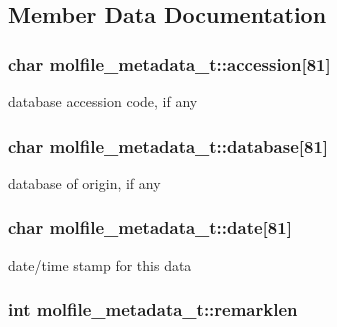 \subsection{\-Member \-Data \-Documentation}
\hypertarget{structmolfile__metadata__t_ae99a07985c93d299ed8383d3ef6fa9e7}{
\subsubsection[{accession}]{\setlength{\rightskip}{0pt plus 5cm}char {\bf molfile\-\_\-metadata\-\_\-t\-::accession}\mbox{[}81\mbox{]}}}\label{structmolfile__metadata__t_ae99a07985c93d299ed8383d3ef6fa9e7}
database accession code, if any \hypertarget{structmolfile__metadata__t_a385ecca8cfa3928877d74d31ad1cc05a}{
\subsubsection[{database}]{\setlength{\rightskip}{0pt plus 5cm}char {\bf molfile\-\_\-metadata\-\_\-t\-::database}\mbox{[}81\mbox{]}}}\label{structmolfile__metadata__t_a385ecca8cfa3928877d74d31ad1cc05a}
database of origin, if any \hypertarget{structmolfile__metadata__t_afe87427566f4e13bf772e204ec52cc23}{
\subsubsection[{date}]{\setlength{\rightskip}{0pt plus 5cm}char {\bf molfile\-\_\-metadata\-\_\-t\-::date}\mbox{[}81\mbox{]}}}\label{structmolfile__metadata__t_afe87427566f4e13bf772e204ec52cc23}
date/time stamp for this data \hypertarget{structmolfile__metadata__t_a8ff113f605527c9710f53b82a991e05c}{
\subsubsection[{remarklen}]{\setlength{\rightskip}{0pt plus 5cm}int {\bf molfile\-\_\-metadata\-\_\-t\-::remarklen}}}\label{structmolfile__metadata__t_a8ff113f605527c9710f53b82a991e05c}
